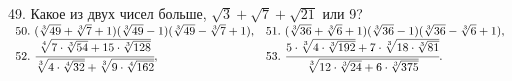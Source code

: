 \documentclass[12pt]{article}
\begin{document}
49. Какое из двух чисел больше, $\sqrt{3}+\sqrt{7}+\sqrt{21}$ или 9?\\
$\begin{array}{ll}
50.\ (\sqrt[3]{49}+\sqrt[3]{7}+1)(\sqrt[3]{49}-1)(\sqrt[3]{49}-\sqrt[3]{7}+1),&
51.\ (\sqrt[3]{36}+\sqrt[3]{6}+1)(\sqrt[3]{36}-1)(\sqrt[3]{36}-\sqrt[3]{6}+1),\\
52.\ \cfrac{\sqrt[4]{7\cdot\sqrt[3]{54}+15\cdot\sqrt[3]{128}}}{\sqrt[3]{4\cdot\sqrt[4]{32}}+\sqrt[3]{9\cdot\sqrt[4]{162}}},&
53.\ \cfrac{5\cdot\sqrt[3]{4\cdot\sqrt[3]{192}}+7\cdot\sqrt[3]{18\cdot\sqrt[3]{81}}}{\sqrt[3]{12\cdot
\sqrt[3]{24}+6\cdot\sqrt[3]{375}}}.
\end{array}$
\newpage
\end{document}
